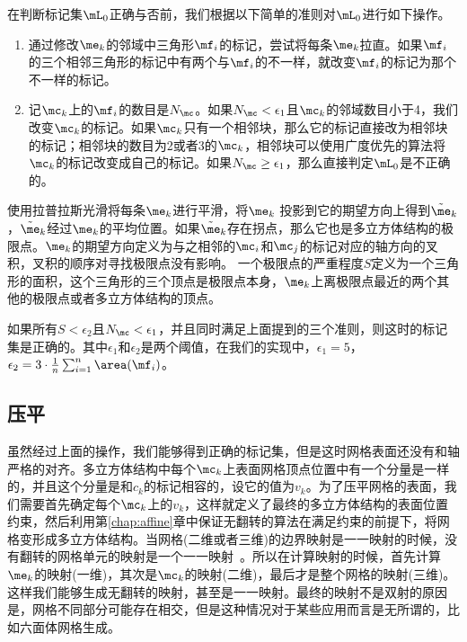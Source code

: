 在判断标记集$\mL_0$正确与否前，我们根据以下简单的准则对$\mL_0$进行如下操作。
\begin{enumerate}
\item 通过修改$\me_k$的邻域中三角形$\mf_i$的标记，尝试将每条$\me_k$拉直。如果$\mf_i$的三个相邻三角形的标记中有两个与$\mf_i$的不一样，就改变$\mf_i$的标记为那个不一样的标记。
\item 记$\mc_k$上的$\mf_i$的数目是$N_{\mc}$。如果$N_{\mc} < \epsilon_1$且$\mc_k$的邻域数目小于4，我们改变$\mc_k$的标记。如果$\mc_k$只有一个相邻块，那么它的标记直接改为相邻块的标记；相邻块的数目为2或者3的$\mc_k$，相邻块可以使用广度优先的算法将$\mc_k$的标记改变成自己的标记。如果$N_{\mc} \geq \epsilon_1$，那么直接判定$\mL_0$是不正确的。
\end{enumerate}

使用拉普拉斯光滑将每条$\me_k$进行平滑，将$\me_k$ 投影到它的期望方向上得到$\tilde{\me}_k$，$\tilde{\me}_k$经过$\me_k$的平均位置。如果$\tilde{\me}_k$存在拐点，那么它也是多立方体结构的极限点。$\me_k$的期望方向定义为与之相邻的$\mc_i$和$\mc_j$的标记对应的轴方向的叉积，叉积的顺序对寻找极限点没有影响。
一个极限点的严重程度$S$定义为一个三角形的面积，这个三角形的三个顶点是极限点本身，$\me_k$上离极限点最近的两个其他的极限点或者多立方体结构的顶点。

如果所有$S<\epsilon_2$且$N_{\mc} < \epsilon_1$，并且同时满足上面提到的三个准则，则这时的标记集是正确的。其中$\epsilon_1$和$\epsilon_2$是两个阈值，在我们的实现中，$\epsilon_1 = 5$，$\epsilon_2 = 3 \cdot \frac{1}{n} \sum_{i=1}^n \area(\mf_i)$。

\subsection{压平} \label{subsec:flatten}
虽然经过上面的操作，我们能够得到正确的标记集，但是这时网格表面还没有和轴严格的对齐。多立方体结构中每个$\mc_k$上表面网格顶点位置中有一个分量是一样的，并且这个分量是和$c_k$的标记相容的，设它的值为$v_k$。为了压平网格的表面，我们需要首先确定每个$\mc_k$上的$v_k$，这样就定义了最终的多立方体结构的表面位置约束，然后利用第\ref{chap:affine}章中保证无翻转的算法在满足约束的前提下，将网格变形成多立方体结构。当网格(二维或者三维)的边界映射是一一映射的时候，没有翻转的网格单元的映射是一个一一映射~\cite{Lipman2012,Aigerman2013}。所以在计算映射的时候，首先计算$\me_k$的映射(一维)，其次是$\mc_k$的映射(二维)，最后才是整个网格的映射(三维)。这样我们能够生成无翻转的映射，甚至是一一映射。最终的映射不是双射的原因是，网格不同部分可能存在相交，但是这种情况对于某些应用而言是无所谓的，比如六面体网格生成。

